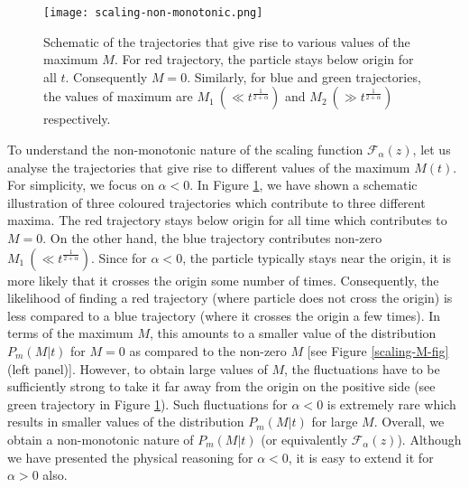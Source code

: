 \documentclass[showpacs,amsmath,amssymb,aps,pre,twocolumn,]{revtex4-1}
\def\greenw#1{{\color{black} #1}}
\begin{document}
\begin{figure}[t]
\texttt{[image: scaling-non-monotonic.png]}
\centering
\caption{Schematic of the trajectories that give rise to various values of the maximum $M$. For red trajectory, the particle stays below origin for all $t$. Consequently $M=0$. Similarly, for blue and green trajectories, the values of maximum are $M_1 ~(\ll t^{\frac{1}{2+\alpha}})$ and $M_2 ~(\gg t^{\frac{1}{2+\alpha}})$ respectively.  }
\label{non-mono-scal-arg-fig}
\end{figure}

\greenw{To understand the non-monotonic nature of the scaling function $\mathcal{F}_{\alpha}(z)$, let us analyse the trajectories that give rise to different values of the maximum $M(t)$. For simplicity, we focus on $\alpha <0$. In Figure \ref{non-mono-scal-arg-fig}, we have shown a schematic illustration of three coloured trajectories which contribute to three different maxima. The red trajectory stays below origin for all time which contributes to $M=0$. On the other hand, the blue trajectory contributes non-zero $M_1 ~(\ll t^{\frac{1}{2+\alpha}})$. Since for $\alpha <0$, the particle typically stays near the origin, it is more likely that it crosses the origin some number of times. Consequently, the likelihood of finding a red trajectory (where particle does not cross the origin) is less compared to a blue trajectory (where it crosses the origin a few times). In terms of the maximum $M$, this amounts to a smaller value of the distribution $P_m(M|t)$ for $M=0$ as compared to the non-zero $M$ [see Figure \ref{scaling-M-fig} (left panel)]. However, to obtain large values of $M$, the fluctuations have to be sufficiently strong to take it far away from the origin on the positive side (see green trajectory in Figure \ref{non-mono-scal-arg-fig}). Such fluctuations for $\alpha <0$ is extremely rare which results in smaller values of the distribution $P_m(M|t)$ for large $M$. Overall, we obtain a non-monotonic nature of $P_m(M|t)$ (or equivalently $\mathcal{F}_{\alpha}(z)$). Although we have presented the physical reasoning for $\alpha <0$, it is easy to extend it for $\alpha >0$ also.}    
\end{document}
